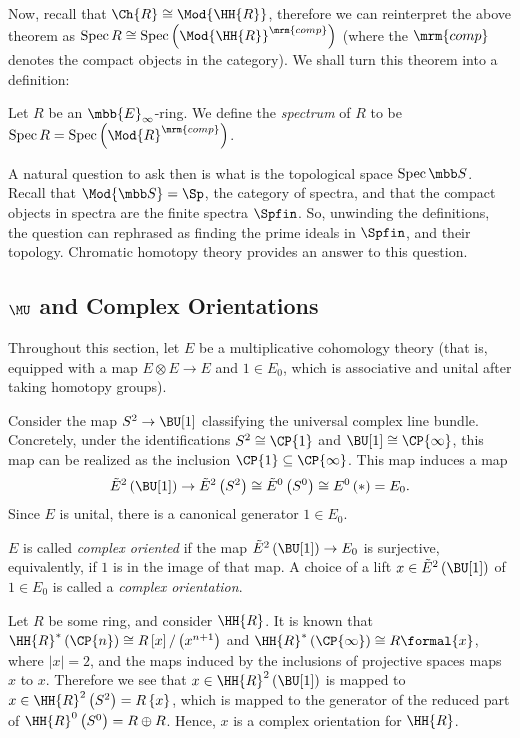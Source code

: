 Now, recall that $\Ch{R} \cong \Mod{\HH{R}}$, therefore we can reinterpret the above theorem as $\spec R \cong \spec\left( \Mod{\HH{R}}^\mrm{comp} \right)$ (where the $\mrm{comp}$ denotes the compact objects in the category).
We shall turn this theorem into a definition:

\begin{definition}
	Let $R$ be an $\mbb{E}_\infty$-ring.
	We define the \emph{spectrum} of $R$ to be
	$\spec R = \spec\left( \Mod{R}^\mrm{comp} \right)$.
\end{definition}

A natural question to ask then is what is the topological space $\spec \SS$.
Recall that $\Mod{\SS} = \Sp$, the category of spectra, and that the compact objects in spectra are the finite spectra $\Spfin$.
So, unwinding the definitions, the question can rephrased as finding the prime ideals in $\Spfin$, and their topology.
Chromatic homotopy theory provides an answer to this question.



\subsection{\texorpdfstring{$\MU$}{MU} and Complex Orientations}

Throughout this section, let $E$ be a multiplicative cohomology theory (that is, equipped with a map $E \otimes E \to E$ and $1 \in E_0$, which is associative and unital after taking homotopy groups).

Consider the map $S^2 \to \BU[1]$ classifying the universal complex line bundle.
Concretely, under the identifications $S^2 \cong \CP{1}$ and $\BU[1] \cong \CP{\infty}$, this map can be realized as the inclusion $\CP{1} \subseteq \CP{\infty}$.
This map induces a map
$$
	\tilde{E}^2\left(\BU[1]\right)
	\to \tilde{E}^2\left(S^2\right)
	\cong \tilde{E}^0\left(S^0\right)
	\cong E^0\left(*\right)
	= E_0.
$$
Since $E$ is unital, there is a canonical generator $1 \in E_0$.

\begin{definition}
	$E$ is called \emph{complex oriented} if the map $\tilde{E}^2\left(\BU[1]\right) \to E_0$ is surjective, equivalently, if $1$ is in the image of that map.
	A choice of a lift $x \in \tilde{E}^2\left(\BU[1]\right)$ of $1 \in E_0$ is called a \emph{complex orientation}.
\end{definition}

\begin{example}\label{HR-1}
	Let $R$ be some ring, and consider $\HH{R}$.
	It is known that
	$\HH{R}^*\left(\CP{n}\right) \cong R \left[x\right] / \left(x^{n+1}\right)$
	and
	$\HH{R}^*\left(\CP{\infty}\right) \cong R \formal{x}$,
	where $\left|x\right| = 2$,
	and the maps induced by the inclusions of projective spaces maps $x$ to $x$.
	Therefore we see that $x \in \HH{R}^2\left(\BU[1]\right)$ is mapped to $x \in \HH{R}^2\left(S^2\right) = R\left\{x\right\}$, which is mapped to the generator of the reduced part of $\HH{R}^0\left(S^0\right) = R \oplus R$.
	Hence, $x$ is a complex orientation for $\HH{R}$.
\end{example}

